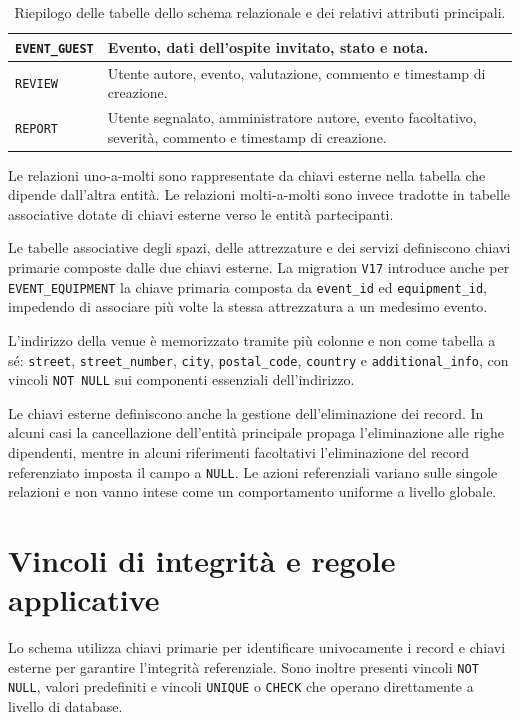 \begin{table}[!htbp]
\begin{tabular}{|p{}|p{}|}
        \hline
        \texttt{EVENT\_GUEST} & Evento, dati dell'ospite invitato, stato e nota. \\
        \hline
        \texttt{REVIEW} & Utente autore, evento, valutazione, commento e timestamp di creazione. \\
        \hline
        \texttt{REPORT} & Utente segnalato, amministratore autore, evento facoltativo, severità, commento e timestamp di creazione. \\
        \hline
    \end{tabular}
    \caption{Riepilogo delle tabelle dello schema relazionale e dei relativi attributi principali.}
    \label{tab:tabelle-db}
\end{table}

Le relazioni uno-a-molti sono rappresentate da chiavi esterne nella tabella che dipende dall'altra entità. Le relazioni molti-a-molti sono invece tradotte in tabelle associative dotate di chiavi esterne verso le entità partecipanti.

Le tabelle associative degli spazi, delle attrezzature e dei servizi
definiscono chiavi primarie composte dalle due chiavi esterne.
La migration \texttt{V17} introduce anche per
\texttt{EVENT\_EQUIPMENT} la chiave primaria composta da
\texttt{event\_id} ed \texttt{equipment\_id}, impedendo di associare
più volte la stessa attrezzatura a un medesimo evento.

L'indirizzo della venue è memorizzato tramite più colonne e non come tabella a sé: \texttt{street}, \texttt{street\_number}, \texttt{city}, \texttt{postal\_code}, \texttt{country} e \texttt{additional\_info}, con vincoli \texttt{NOT NULL} sui componenti essenziali dell'indirizzo.

Le chiavi esterne definiscono anche la gestione dell'eliminazione dei record. In alcuni casi la cancellazione dell'entità principale propaga l'eliminazione alle righe dipendenti, mentre in alcuni riferimenti facoltativi l'eliminazione del record referenziato imposta il campo a \texttt{NULL}. Le azioni referenziali variano sulle singole relazioni e non vanno intese come un comportamento uniforme a livello globale.

\section{Vincoli di integrità e regole applicative}

Lo schema utilizza chiavi primarie per identificare univocamente i record e chiavi esterne per garantire l'integrità referenziale. Sono inoltre presenti vincoli \texttt{NOT NULL}, valori predefiniti e vincoli \texttt{UNIQUE} o \texttt{CHECK} che operano direttamente a livello di database.

